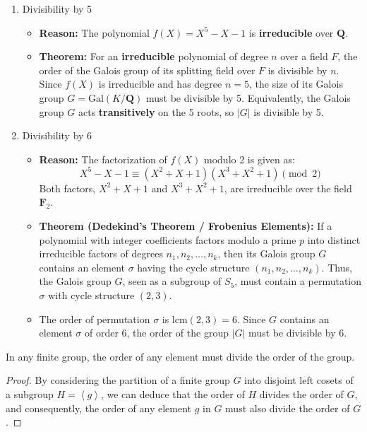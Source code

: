 \begin{enumerate}
	\item Divisibility by 5
	\begin{itemize}
		\item \textbf{Reason:} The polynomial $f(X) = X^5 - X - 1$ is \textbf{irreducible} over $\mathbf{Q}$.
		\item \textbf{Theorem:} For an \textbf{irreducible} polynomial of degree $n$ over a field $F$, the order of the Galois group of its splitting field over $F$ is divisible by $n$. Since $f(X)$ is irreducible and has degree $n=5$, the size of its Galois group $G = \text{Gal}(K/\mathbf{Q})$ must be divisible by 5. Equivalently, the Galois group $G$ acts \textbf{transitively} on the 5 roots, so $|G|$ is divisible by 5.
	\end{itemize}
	\item Divisibility by 6
	\begin{itemize}
		\item \textbf{Reason:} The factorization of $f(X)$ modulo 2 is given as:
\[
X^5 - X - 1 \equiv (X^2 + X + 1)(X^3 + X^2 + 1) \pmod 2
\]Both factors, $X^2+X+1$ and $X^3+X^2+1$, are irreducible over the field $\mathbf{F}_2$.
		\item \textbf{Theorem (Dedekind's Theorem / Frobenius Elements):} If a polynomial with integer coefficients factors modulo a prime $p$ into distinct irreducible factors of degrees $n_1, n_2, \dots, n_k$, then its Galois group $G$ contains an element $\sigma$ having the cycle structure $(n_1, n_2, \dots, n_k)$. Thus, the Galois group $G$, seen as a subgroup of $S_5$, must contain a permutation $\sigma$ with cycle structure $(2, 3)$.
		\item The order of permutation $\sigma$ is $\text{lcm}(2, 3) = 6$. Since $G$ contains an element $\sigma$ of order 6, the order of the group $|G|$ must be divisible by 6.
	\end{itemize}
\end{enumerate}

\begin{theorem}
In any finite group, the order of any element must divide the order of the group.
\end{theorem}
\begin{proof}
By considering the partition of a finite group $G$ into disjoint left cosets of a subgroup $H=\left< g \right>$, we can deduce that the order of $H$ divides the order of $G$, and consequently, the order of any element $g$ in $G$ must also divide the order of $G$.
\end{proof}

